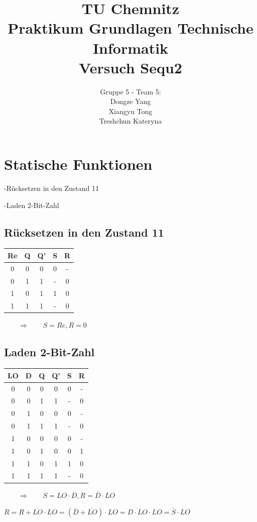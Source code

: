 \documentclass[fleqn]{article}
\title{TU Chemnitz \\ Praktikum Grundlagen Technische Informatik \\ Versuch Sequ2}
\author{Gruppe 5 - Team 5: \\ Dongze Yang \\Xiangyu Tong \\ Treshchun Kateryna}
\begin{document}
\maketitle



\pagestyle{main}

\section{Statische Funktionen}

-Rücksetzen in den Zustand 11

\noindent-Laden 2-Bit-Zahl

\subsection{Rücksetzen in den Zustand 11}

\begin{center}
    \begin{tabular}{c|c|c|c|c}
        Re&Q&Q'&S&R\\
        \hline
        0&0&0&0&-\\
        0&1&1&-&0\\
        1&0&1&1&0\\
        1&1&1&-&0
    \end{tabular}
    $\qquad \Rightarrow\qquad S=Re,R=0$
\end{center}

\subsection{Laden 2-Bit-Zahl}

\begin{center}
    \begin{tabular}{c|c|c|c|c|c}
        LO&D&Q&Q'&S&R\\
        \hline
        0&0&0&0&0&-\\
        0&0&1&1&-&0\\
        0&1&0&0&0&-\\
        0&1&1&1&-&0\\
        1&0&0&0&0&-\\
        1&0&1&0&0&1\\
        1&1&0&1&1&0\\
        1&1&1&1&-&0
    \end{tabular}
    $\qquad\Rightarrow\qquad S=LO\cdot D,R=\overline{D}\cdot LO $
    
    $R= R + \overline{LO}\cdot LO = (\overline{D}+\overline{LO})\cdot LO = \overline{D\cdot LO}\cdot LO = \overline{S}\cdot LO$
    
\end{center}
\end{document}
